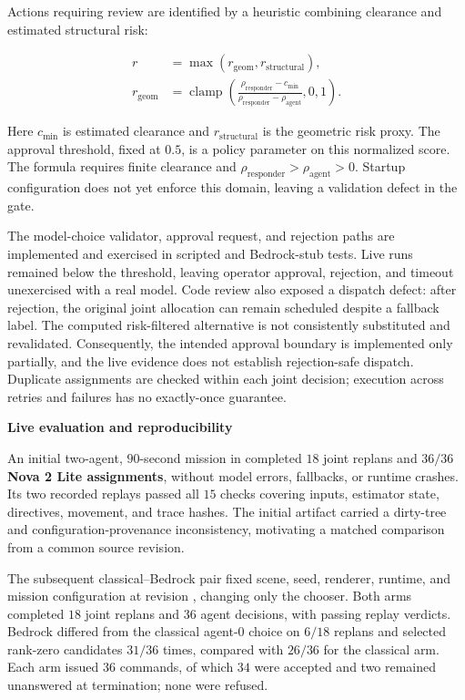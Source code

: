 \documentclass[10pt,a4paper]{article}
\newcommand{\code}[1]{\texttt{\small\detokenize{#1}}}
\newcommand{\indentedheading}[1]{\par\addvspace{0.65em}\noindent\hspace*{1em}\textbf{#1}\par\smallskip}
\begin{document}
Actions requiring review are identified by a heuristic combining
clearance and estimated structural risk:

\begin{equation}
\begin{aligned}
r &= \max(r_{\mathrm{geom}},r_{\mathrm{structural}}),\\
r_{\mathrm{geom}} &=
\operatorname{clamp}\!\left(
\frac{\rho_{\mathrm{responder}}-c_{\min}}
{\rho_{\mathrm{responder}}-\rho_{\mathrm{agent}}},
0,1\right).
\end{aligned}
\label{eq:agentic-risk}
\end{equation}

Here $c_{\min}$ is estimated clearance and
$r_{\mathrm{structural}}$ is the geometric risk proxy.
The approval threshold, fixed at $0.5$, is a policy parameter
on this normalized score. The formula requires finite clearance
and $\rho_{\mathrm{responder}}>\rho_{\mathrm{agent}}>0$.
Startup configuration does not yet enforce this domain,
leaving a validation defect in the gate.

The model-choice validator, approval request, and rejection paths
are implemented and exercised in scripted and Bedrock-stub tests.
Live runs remained below the threshold, leaving operator approval,
rejection, and timeout unexercised with a real model. Code review
also exposed a dispatch defect: after rejection, the original
joint allocation can remain scheduled despite a fallback label.
The computed risk-filtered alternative is not consistently
substituted and revalidated. Consequently, the intended approval
boundary is implemented only partially, and the live evidence
does not establish rejection-safe dispatch. Duplicate assignments
are checked within each joint decision; execution across retries
and failures has no exactly-once guarantee.

\indentedheading{Live evaluation and reproducibility}

An initial two-agent, $90$-second mission in
\code{maze\_short\_6} completed $18$ joint replans and
\textbf{$36/36$ Nova 2 Lite assignments}, without model errors,
fallbacks, or runtime crashes. Its two recorded replays passed
all $15$ checks covering inputs, estimator state, directives,
movement, and trace hashes. The initial artifact carried a
dirty-tree and configuration-provenance inconsistency, motivating
a matched comparison from a common source revision.

The subsequent classical--Bedrock pair fixed scene, seed,
renderer, runtime, and mission configuration at revision
\code{c143db14}, changing only the chooser. Both arms completed
$18$ joint replans and $36$ agent decisions, with passing replay
verdicts. Bedrock differed from the classical agent-0 choice
on $6/18$ replans and selected rank-zero candidates $31/36$
times, compared with $26/36$ for the classical arm. Each arm
issued $36$ commands, of which $34$ were accepted and two
remained unanswered at termination; none were refused.
\end{document}
